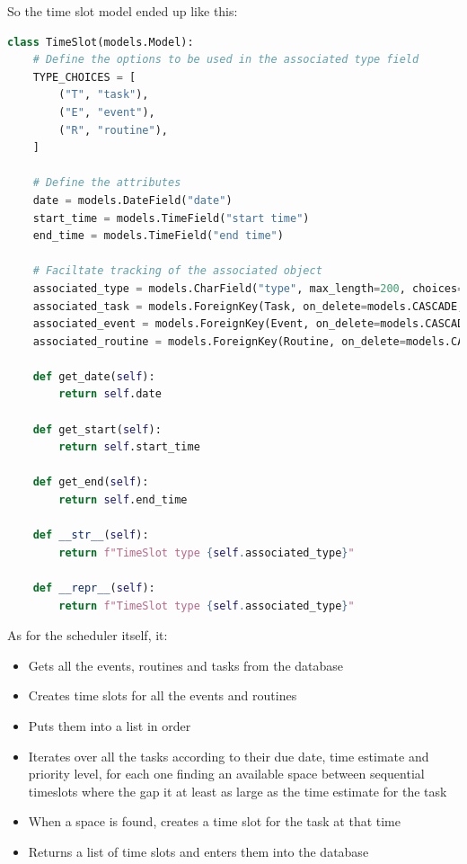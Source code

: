 \documentclass{article}
\begin{document}
So the time slot model ended up like this:
\begin{lstlisting}[language=Python]
class TimeSlot(models.Model):
    # Define the options to be used in the associated type field
    TYPE_CHOICES = [
        ("T", "task"),
        ("E", "event"),
        ("R", "routine"),
    ]

    # Define the attributes
    date = models.DateField("date")
    start_time = models.TimeField("start time")
    end_time = models.TimeField("end time")

    # Faciltate tracking of the associated object
    associated_type = models.CharField("type", max_length=200, choices=TYPE_CHOICES)
    associated_task = models.ForeignKey(Task, on_delete=models.CASCADE, null=True)
    associated_event = models.ForeignKey(Event, on_delete=models.CASCADE, null=True)
    associated_routine = models.ForeignKey(Routine, on_delete=models.CASCADE, null=True)

    def get_date(self):
        return self.date

    def get_start(self):
        return self.start_time

    def get_end(self):
        return self.end_time

    def __str__(self):
        return f"TimeSlot type {self.associated_type}"

    def __repr__(self):
        return f"TimeSlot type {self.associated_type}"
\end{lstlisting}

As for the scheduler itself, it:
\begin{itemize}
	\item Gets all the events, routines and tasks from the database
	\item Creates time slots for all the events and routines
	\item Puts them into a list in order
	\item Iterates over all the tasks according to their due date, time estimate and priority level,
	      for each one finding an available space between sequential timeslots
	      where the gap it at least as large as the time estimate for the task
	\item When a space is found, creates a time slot for the task at that time
	\item Returns a list of time slots and enters them into the database
\end{itemize}
\end{document}
